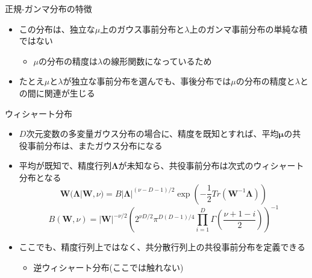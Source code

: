 \begin{frame}{正規-ガンマ分布の特徴}
 \begin{itemize}
  \item この分布は、独立な$\mu$上のガウス事前分布と$\lambda$上のガンマ事前分布の単純な積ではない
        \begin{itemize}
         \item $\mu$の分布の精度は$\lambda$の線形関数になっているため
        \end{itemize}
  \item たとえ$\mu$と$\lambda$が独立な事前分布を選んでも、事後分布では$\mu$の分布の精度と$\lambda$との間に関連が生じる
 \end{itemize}
\end{frame}

\begin{frame}{ウィシャート分布}
 \begin{itemize}
  \item $D$次元変数の多変量ガウス分布の場合に、\alert{精度を既知}とすれば、平均$\bm{\mu}$の共役事前分布は、またガウス分布になる
  \item \alert{平均が既知}で、精度行列$\bm{\Lambda}$が未知なら、共役事前分布は次式のウィシャート分布となる
        \begin{equation}
         \bm{W}(\bm{\Lambda}|\bm{W},\nu) = B|\bm{\Lambda}|^{(\nu-D-1)/2}\exp\left(-\frac{1}{2}Tr(\bm{W}^{-1}\bm{\Lambda})\right)
        \end{equation}
        \begin{equation}
         B(\bm{W},\nu) = |\bm{W}|^{-\nu/2}\left(2^{\nu D/2}\pi^{D(D-1)/4}\prod_{i=1}^D\Gamma\left(\frac{\nu+1-i}{2}\right)\right)^{-1}
        \end{equation}
  \item ここでも、精度行列上ではなく、共分散行列上の共役事前分布を定義できる
        \begin{itemize}
         \item 逆ウィシャート分布(ここでは触れない)
        \end{itemize}
 \end{itemize}
\end{frame}

